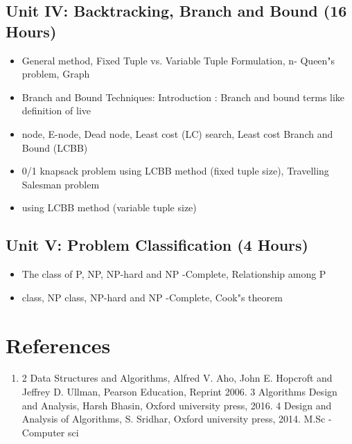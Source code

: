 \documentclass[12pt,a4paper]{article}%
\begin{document}
%
\subsection{Unit IV: Backtracking, Branch and Bound (16 Hours)}%
\label{subsec:UnitIVBacktracking,BranchandBound(16Hours)}%
\begin{itemize}%
\item General method, Fixed Tuple vs. Variable Tuple Formulation, n- Queen"s problem, Graph%
\item Branch and Bound Techniques: Introduction : Branch and bound terms like definition of live%
\item node, E-node, Dead node, Least cost (LC) search, Least cost Branch and Bound (LCBB)%
\item 0/1 knapsack problem using LCBB method (fixed tuple size), Travelling Salesman problem%
\item using LCBB method (variable tuple size)%
\end{itemize}

%
\subsection{Unit V: Problem Classification (4 Hours)}%
\label{subsec:UnitVProblemClassification(4Hours)}%
\begin{itemize}%
\item The class of P, NP, NP-hard and NP -Complete, Relationship among P%
\item class, NP class, NP-hard and NP -Complete, Cook"s theorem%
\end{itemize}

%
\section{References}%
\label{sec:References}%
\begin{enumerate}%
\item 2 Data Structures and Algorithms, Alfred V. Aho, John E. Hopcroft and Jeffrey D. Ullman, Pearson
Education, Reprint 2006.
3 Algorithms Design and Analysis, Harsh Bhasin, Oxford university press, 2016.
4 Design and Analysis of Algorithms, S. Sridhar, Oxford university press, 2014.
M.Sc - Computer sci%
\end{enumerate}

%
\end{document}
